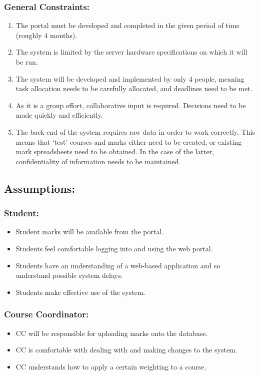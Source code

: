 \documentclass[paper=a4, fontsize=11pt]{scrartcl}
\numberwithin{equation}{section}		%
\numberwithin{figure}{section}			%
\numberwithin{table}{section}				%
\begin{document}
\subsubsection{General Constraints:}
\begin{enumerate}
\item The portal must be developed and completed in the given period of time (roughly 4
months).
\item The system is limited by the server hardware specifications on which it will be run.
\item The system will be developed and implemented by only 4 people, meaning task
allocation needs to be carefully allocated, and deadlines need to be met.
\item As it is a group effort, collaborative input is required. Decisions need to be made
quickly and efficiently.
\item The back-end of the system requires raw data in order to work correctly. This means
that ‘test’ courses and marks either need to be created, or existing mark
spreadsheets need to be obtained. In the case of the latter, confidentiality of
information needs to be maintained.\\
\end{enumerate}

\subsection{Assumptions:}
\subsubsection{Student:}
\begin{itemize}
\item Student marks will be available from the portal.
\item Students feel comfortable logging into and using the web portal.
\item Students have an understanding of a web-based application and so understand
possible system delays.
\item Students make effective use of the system.
\end{itemize}

\subsubsection{Course Coordinator:}
\begin{itemize}
\item CC will be responsible for uploading marks onto the database.
\item CC is comfortable with dealing with and making changes to the system.
\item CC understands how to apply a certain weighting to a course.
\end{itemize}
\end{document}
